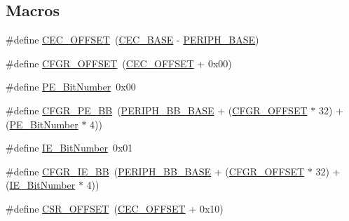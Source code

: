 \subsection*{Macros}
\begin{DoxyCompactItemize}
\item 
\#define \hyperlink{group___c_e_c___private___defines_ga675324bd8967b75f32554f50210821af}{C\+E\+C\+\_\+\+O\+F\+F\+S\+ET}~(\hyperlink{group___peripheral__memory__map_gaacb77bc44b3f8c87ab98f241e760e440}{C\+E\+C\+\_\+\+B\+A\+SE} -\/ \hyperlink{openmotestm_2library_2inc_2stm32f10x__map_8h_a9171f49478fa86d932f89e78e73b88b0}{P\+E\+R\+I\+P\+H\+\_\+\+B\+A\+SE})
\item 
\#define \hyperlink{group___c_e_c___private___defines_ga8682298330c3b9bae1992e4f1a0af985}{C\+F\+G\+R\+\_\+\+O\+F\+F\+S\+ET}~(\hyperlink{group___c_e_c___private___defines_ga675324bd8967b75f32554f50210821af}{C\+E\+C\+\_\+\+O\+F\+F\+S\+ET} + 0x00)
\item 
\#define \hyperlink{group___c_e_c___private___defines_ga321e547b9574b065127c882e09a4f7e7}{P\+E\+\_\+\+Bit\+Number}~0x00
\item 
\#define \hyperlink{group___c_e_c___private___defines_ga9d1f044508cda5ad8213bd7bc5c4363d}{C\+F\+G\+R\+\_\+\+P\+E\+\_\+\+BB}~(\hyperlink{openmotestm_2library_2inc_2stm32f10x__map_8h_aed7efc100877000845c236ccdc9e144a}{P\+E\+R\+I\+P\+H\+\_\+\+B\+B\+\_\+\+B\+A\+SE} + (\hyperlink{openmotestm_2library_2src_2stm32f10x__rcc_8c_a8682298330c3b9bae1992e4f1a0af985}{C\+F\+G\+R\+\_\+\+O\+F\+F\+S\+ET} $\ast$ 32) + (\hyperlink{group___c_e_c___private___defines_ga321e547b9574b065127c882e09a4f7e7}{P\+E\+\_\+\+Bit\+Number} $\ast$ 4))
\item 
\#define \hyperlink{group___c_e_c___private___defines_ga57731312db52f3498312a56e98166fad}{I\+E\+\_\+\+Bit\+Number}~0x01
\item 
\#define \hyperlink{group___c_e_c___private___defines_gac7fe35cf912353ca51a56c5f1f25b2fb}{C\+F\+G\+R\+\_\+\+I\+E\+\_\+\+BB}~(\hyperlink{openmotestm_2library_2inc_2stm32f10x__map_8h_aed7efc100877000845c236ccdc9e144a}{P\+E\+R\+I\+P\+H\+\_\+\+B\+B\+\_\+\+B\+A\+SE} + (\hyperlink{openmotestm_2library_2src_2stm32f10x__rcc_8c_a8682298330c3b9bae1992e4f1a0af985}{C\+F\+G\+R\+\_\+\+O\+F\+F\+S\+ET} $\ast$ 32) + (\hyperlink{group___c_e_c___private___defines_ga57731312db52f3498312a56e98166fad}{I\+E\+\_\+\+Bit\+Number} $\ast$ 4))
\item 
\#define \hyperlink{group___c_e_c___private___defines_ga984cbe73312b6d3d355c5053763d499a}{C\+S\+R\+\_\+\+O\+F\+F\+S\+ET}~(\hyperlink{group___c_e_c___private___defines_ga675324bd8967b75f32554f50210821af}{C\+E\+C\+\_\+\+O\+F\+F\+S\+ET} + 0x10)

\end{DoxyCompactItemize}
